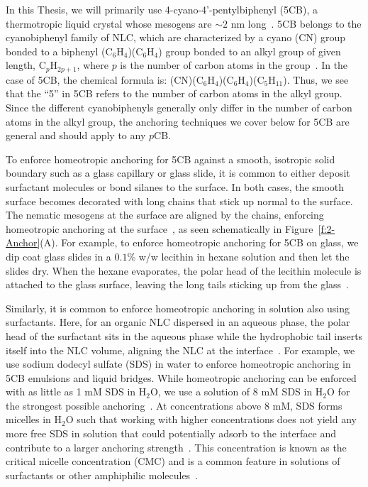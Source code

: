 In this Thesis, we will primarily use 4-cyano-4'-pentylbiphenyl (5CB), a thermotropic liquid crystal whose mesogens are $\sim 2$ nm long~\cite{RN33}.\@
5CB belongs to the cyanobiphenyl family of NLC, which are characterized by a cyano (CN) group  bonded to a biphenyl (C$_6$H$_4$)(C$_6$H$_4$) group bonded to an alkyl group of given length, C$_p$H$_{2p+1}$, where $p$ is the number of carbon atoms in the group~\cite{RN33}.
In the case of 5CB, the chemical formula is: (CN)(C$_6$H$_4$)(C$_6$H$_4$)(C$_5$H$_{11}$).
Thus, we see that the ``5'' in 5CB refers to the number of carbon atoms in the alkyl group.
Since the different cyanobiphenyls generally only differ in the number of carbon atoms in the alkyl group, the anchoring techniques we cover below for 5CB are general and should apply to any $p$CB.

To enforce homeotropic anchoring for 5CB against a smooth, isotropic solid boundary such as a glass capillary or glass slide, it is common to either deposit surfactant molecules or bond silanes to the surface.
In both cases, the smooth surface becomes decorated with long chains that stick up normal to the surface.
The nematic mesogens at the surface are aligned by the chains, enforcing homeotropic anchoring at the surface~\cite{RN33}, as seen schematically in Figure~\ref{f:2-Anchor}(A).
For example, to enforce homeotropic anchoring for 5CB on glass, we dip coat glass slides in a $0.1$\% w/w lecithin in hexane solution and then let the slides dry.
When the hexane evaporates, the polar head of the lecithin molecule is attached to the glass surface, leaving the long tails sticking up from the glass~\cite{RN140}.

Similarly, it is common to enforce homeotropic anchoring in solution also using surfactants.
Here, for an organic NLC dispersed in an aqueous phase, the polar head of the surfactant sits in the aqueous phase while the hydrophobic tail inserts itself into the NLC volume, aligning the NLC at the interface~\cite{RN150,RN235}.
For example, we use sodium dodecyl sulfate (SDS) in water to enforce homeotropic anchoring in 5CB emulsions and liquid bridges.
While homeotropic anchoring can be enforced with as little as 1 mM SDS in H$_2$O, we use a solution of 8 mM SDS in H$_2$O for the strongest possible anchoring~\cite{RN235}.
At concentrations above 8 mM, SDS forms micelles in H$_2$O such that working with higher concentrations does not yield any more free SDS in solution that could potentially adsorb to the interface and contribute to a larger anchoring strength~\cite{RN234}.
This concentration is known as the critical micelle concentration (CMC) and is a common feature in solutions of surfactants or other amphiphilic molecules~\cite{RN233,RN234}. \\

